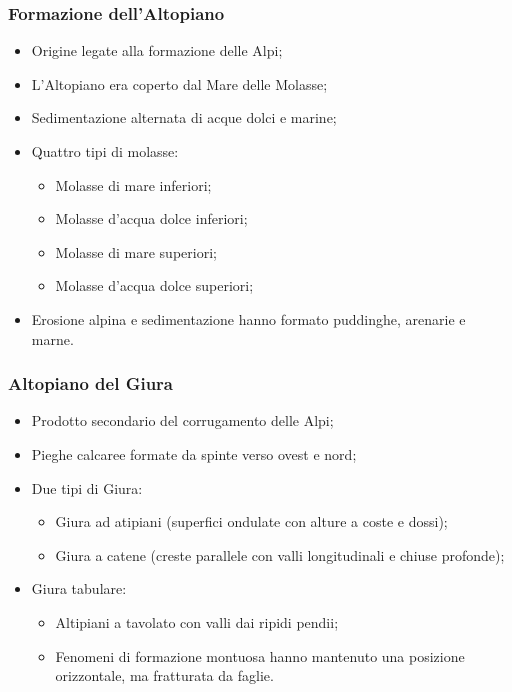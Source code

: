 \documentclass{article}
\begin{document}
\subsubsection{Formazione dell'Altopiano}
\begin{itemize}
    \item Origine legate alla formazione delle Alpi;
    \item L'Altopiano era coperto dal Mare delle Molasse;
    \item Sedimentazione alternata di acque dolci e marine;
    \item Quattro tipi di molasse:
        \begin{itemize}
            \item Molasse di mare inferiori;
            \item Molasse d'acqua dolce inferiori;
            \item Molasse di mare superiori;
            \item Molasse d'acqua dolce superiori;
        \end{itemize}
    \item Erosione alpina e sedimentazione hanno formato puddinghe, arenarie e marne.
\end{itemize}

\subsubsection{Altopiano del Giura}
\begin{itemize}
    \item Prodotto secondario del corrugamento delle Alpi;
    \item Pieghe calcaree formate da spinte verso ovest e nord;
    \item Due tipi di Giura:
        \begin{itemize}
            \item Giura ad atipiani (superfici ondulate con alture a coste e dossi);
            \item Giura a catene (creste parallele con valli longitudinali e chiuse profonde);
        \end{itemize}
    \item Giura tabulare:
        \begin{itemize}
            \item Altipiani a tavolato con valli dai ripidi pendii;
            \item Fenomeni di formazione montuosa hanno mantenuto una posizione orizzontale,
                ma fratturata da faglie.
        \end{itemize}
\end{itemize}
\end{document}
